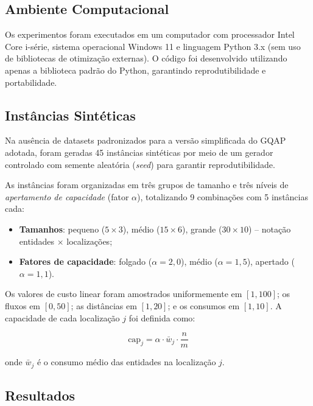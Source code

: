 \documentclass[12pt]{article}
\begin{document}
\subsection{Ambiente Computacional}

Os experimentos foram executados em um computador com processador Intel Core
i-série, sistema operacional Windows 11 e linguagem Python 3.x (sem uso de
bibliotecas de otimização externas). O código foi desenvolvido utilizando apenas
a biblioteca padrão do Python, garantindo reprodutibilidade e portabilidade.

\subsection{Instâncias Sintéticas}

Na ausência de datasets padronizados para a versão simplificada do GQAP adotada,
foram geradas 45 instâncias sintéticas por meio de um gerador controlado
com semente aleatória (\textit{seed}) para garantir reprodutibilidade.

As instâncias foram organizadas em três grupos de tamanho e três níveis de
\textit{apertamento de capacidade} (fator $\alpha$), totalizando 9 combinações
com 5 instâncias cada:

\begin{itemize}
  \item \textbf{Tamanhos}: pequeno ($5 \times 3$), médio ($15 \times 6$),
        grande ($30 \times 10$) -- notação entidades $\times$ localizações;
  \item \textbf{Fatores de capacidade}: folgado ($\alpha = 2{,}0$),
        médio ($\alpha = 1{,}5$), apertado ($\alpha = 1{,}1$).
\end{itemize}

Os valores de custo linear foram amostrados uniformemente em $[1, 100]$;
os fluxos em $[0, 50]$; as distâncias em $[1, 20]$; e os consumos em $[1, 10]$.
A capacidade de cada localização $j$ foi definida como:

\begin{equation}
\text{cap}_j = \alpha \cdot \bar{w}_j \cdot \frac{n}{m}
\end{equation}

onde $\bar{w}_j$ é o consumo médio das entidades na localização $j$.

\subsection{Resultados}
\end{document}

